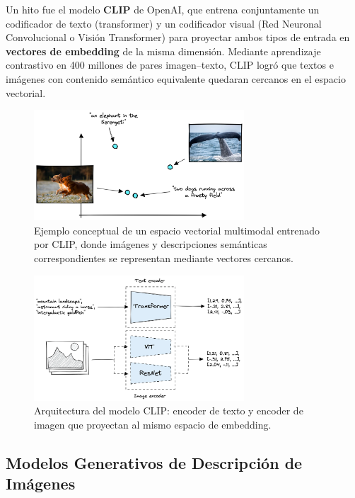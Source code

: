 Un hito fue el modelo \textbf{CLIP} de OpenAI, que entrena conjuntamente un codificador de texto (transformer) y un codificador visual (Red Neuronal Convolucional o Visión Transformer) para proyectar ambos tipos de entrada en \textbf{vectores de embedding} de la misma dimensión. Mediante aprendizaje contrastivo en 400 millones de pares imagen--texto, CLIP logró que textos e imágenes con contenido semántico equivalente quedaran cercanos en el espacio vectorial.

\begin{figure}[h]
  \centering
  \includegraphics[width=0.7\textwidth]{archivos/clip_space.png}
  \caption[Espacio vectorial multimodal de CLIP]{Ejemplo conceptual de un espacio vectorial multimodal entrenado por CLIP, donde imágenes y descripciones semánticas correspondientes se representan mediante vectores cercanos.}
  \label{fig:clip_space}
\end{figure}

\begin{figure}[h]
  \centering
  \includegraphics[width=0.7\textwidth]{archivos/clip_architecture.png}
  \caption[Arquitectura de CLIP]{Arquitectura del modelo CLIP: encoder de texto y encoder de imagen que proyectan al mismo espacio de embedding.}
  \label{fig:clip_architecture}
\end{figure}

\subsection{Modelos Generativos de Descripción de Imágenes}

